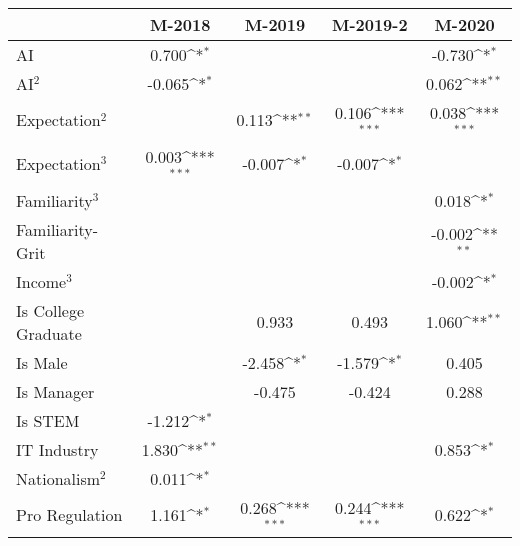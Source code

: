 {
\def\sym#1{\ifmmode^{#1}\else\(^{#1}\)\fi}
\begin{tabular}{l*{4}{c}}
    \toprule
                        & M-2018         & M-2019         & M-2019-2       & M-2020                \\
    \midrule
    AI                  & 0.700\sym{*}   &                &                & -0.730\sym{*}         \\
    \addlinespace
    AI$^2$              & -0.065\sym{*}  &                &                & 0.062\sym{**}         \\
    \addlinespace
    Expectation$^2$     &                & 0.113\sym{**}  & 0.106\sym{***} & 0.038\sym{***}        \\
    \addlinespace
    Expectation$^3$     & 0.003\sym{***} & -0.007\sym{*}  & -0.007\sym{*}  &                       \\
    \addlinespace
    Familiarity$^3$     &                &                &                & 0.018\sym{*}          \\
    \addlinespace
    Familiarity-Grit    &                &                &                & -0.002\sym{**}        \\
    \addlinespace
    Income$^3$          &                &                &                & -0.002\sym{*}         \\
    \addlinespace
    Is College Graduate &                & 0.933          & 0.493          & 1.060\sym{**}         \\
    \addlinespace
    Is Male             &                & -2.458\sym{*}  & -1.579\sym{*}  & 0.405                 \\
    \addlinespace
    Is Manager          &                & -0.475         & -0.424         & 0.288                 \\
    \addlinespace
    Is STEM             & -1.212\sym{*}  &                &                &                       \\
    \addlinespace
    IT Industry         & 1.830\sym{**}  &                &                & 0.853\sym{*}          \\
    \addlinespace
    Nationalism$^2$     & 0.011\sym{*}   &                &                &                       \\
    \addlinespace
    Pro Regulation      & 1.161\sym{*}   & 0.268\sym{***} & 0.244\sym{***} & 0.622\sym{*}          \\

\end{tabular}}
